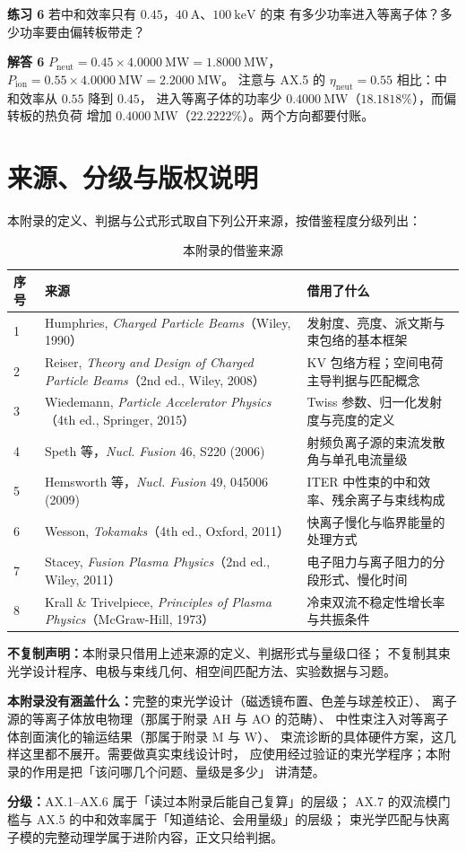 \textbf{练习 6} 若中和效率只有 $0.45$，$40\ \mathrm{A}$、$100\ \mathrm{keV}$ 的束
有多少功率进入等离子体？多少功率要由偏转板带走？

\textbf{解答 6} $P_\mathrm{neut}=0.45\times4.0000\ \mathrm{MW}=1.8000\ \mathrm{MW}$，
$P_\mathrm{ion}=0.55\times4.0000\ \mathrm{MW}=2.2000\ \mathrm{MW}$。
注意与 AX.5 的 $\eta_\mathrm{neut}=0.55$ 相比：中和效率从 $0.55$ 降到 $0.45$，
进入等离子体的功率少 $0.4000\ \mathrm{MW}$（$18.1818\%$），而偏转板的热负荷
增加 $0.4000\ \mathrm{MW}$（$22.2222\%$）。两个方向都要付账。

\section{来源、分级与版权说明}
\label{sec:app-ax-source}

\begingroup\small
本附录的定义、判据与公式形式取自下列公开来源，按借鉴程度分级列出：

\begin{table}[htbp]
\centering
\small
\caption{本附录的借鉴来源}
\label{tab:app-ax-source}
\begin{tabular}{p{0.6cm}p{6.2cm}p{7.0cm}}
\hline
序号 & 来源 & 借用了什么 \\
\hline
1 & Humphries, \emph{Charged Particle Beams}（Wiley, 1990） & 发射度、亮度、派文斯与束包络的基本框架 \\
2 & Reiser, \emph{Theory and Design of Charged Particle Beams}（2nd ed., Wiley, 2008） & KV 包络方程；空间电荷主导判据与匹配概念 \\
3 & Wiedemann, \emph{Particle Accelerator Physics}（4th ed., Springer, 2015） & Twiss 参数、归一化发射度与亮度的定义 \\
4 & Speth 等，\emph{Nucl. Fusion} 46, S220 (2006) & 射频负离子源的束流发散角与单孔电流量级 \\
5 & Hemsworth 等，\emph{Nucl. Fusion} 49, 045006 (2009) & ITER 中性束的中和效率、残余离子与束线构成 \\
6 & Wesson, \emph{Tokamaks}（4th ed., Oxford, 2011） & 快离子慢化与临界能量的处理方式 \\
7 & Stacey, \emph{Fusion Plasma Physics}（2nd ed., Wiley, 2011） & 电子阻力与离子阻力的分段形式、慢化时间 \\
8 & Krall \& Trivelpiece, \emph{Principles of Plasma Physics}（McGraw-Hill, 1973） & 冷束双流不稳定性增长率与共振条件 \\
\hline
\end{tabular}
\end{table}

\textbf{不复制声明：}本附录只借用上述来源的定义、判据形式与量级口径；
不复制其束光学设计程序、电极与束线几何、相空间匹配方法、实验数据与习题。

\textbf{本附录没有涵盖什么：}完整的束光学设计（磁透镜布置、色差与球差校正）、
离子源的等离子体放电物理（那属于附录 AH 与 AO 的范畴）、
中性束注入对等离子体剖面演化的输运结果（那属于附录 M 与 W）、
束流诊断的具体硬件方案，这几样这里都不展开。需要做真实束线设计时，
应使用经过验证的束光学程序；本附录的作用是把「该问哪几个问题、量级是多少」
讲清楚。

\textbf{分级：}AX.1--AX.6 属于「读过本附录后能自己复算」的层级；
AX.7 的双流模门槛与 AX.5 的中和效率属于「知道结论、会用量级」的层级；
束光学匹配与快离子模的完整动理学属于进阶内容，正文只给判据。
\endgroup
